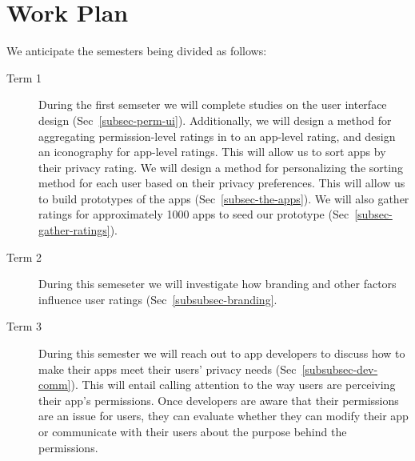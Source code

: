 \documentclass[11pt]{article}
\begin{document}
\section{Work Plan}

We anticipate the semesters being divided as
follows:
\begin{description}

\item[Term 1]
During the first semseter we will complete studies on the user interface design
(Sec~\ref{subsec-perm-ui}). Additionally, we will design a method for aggregating 
permission-level ratings in to an app-level rating, and design an iconography
for app-level ratings. This will allow us to sort apps by their privacy rating.
We will design a method for personalizing the sorting method for each user
based on their privacy preferences.
This will allow us to build prototypes of the 
apps (Sec~\ref{subsec-the-apps}). We will also gather ratings for 
approximately 1000 apps to seed our prototype (Sec~\ref{subsec-gather-ratings}).

\item[Term 2]
During this semeseter we will investigate how branding and other factors
influence user ratings (Sec~\ref{subsubsec-branding}.

\item[Term 3] 
During this semester we will reach out to app developers to discuss
how to make their apps meet their users' privacy needs 
(Sec~\ref{subsubsec-dev-comm}). This will entail
calling attention to the way users are perceiving their app's
permissions. Once developers are aware that their permissions are an
issue for users, they can evaluate whether they can modify their app
or communicate with their users about the purpose behind the
permissions.


\end{description}
\end{document}
